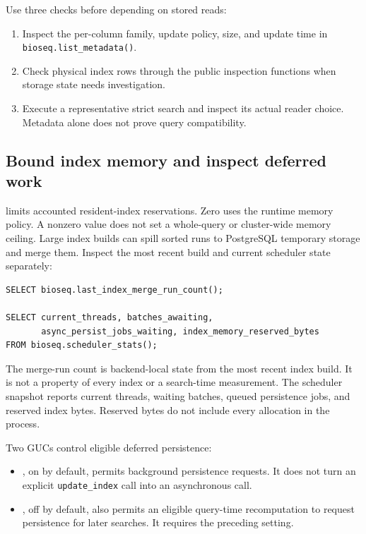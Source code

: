 Use three checks before depending on stored reads:
\begin{enumerate}
  \item Inspect the per-column family, update policy, size, and update
    time in \nolinkurl{bioseq.list_metadata()}.
  \item Check physical index rows through the public inspection
    functions when storage state needs investigation.
  \item Execute a representative strict search and inspect its actual
    reader choice. Metadata alone does not prove query compatibility.
\end{enumerate}

\subsection{Bound index memory and inspect deferred work}

 limits accounted resident-index
reservations. Zero uses the runtime memory policy. A nonzero value does
not set a whole-query or cluster-wide memory ceiling. Large index builds
can spill sorted runs to PostgreSQL temporary storage and merge them.
Inspect the most recent build and current scheduler state separately:

\par\noindent\begin{minipage}{\linewidth}
\begin{lstlisting}[style=bioseq-appendix-sql,
  caption={Inspect index construction and scheduler reservations.}]
SELECT bioseq.last_index_merge_run_count();

SELECT current_threads, batches_awaiting,
       async_persist_jobs_waiting, index_memory_reserved_bytes
FROM bioseq.scheduler_stats();
\end{lstlisting}
\end{minipage}

The merge-run count is backend-local state from the most recent index
build. It is not a property of every index or a search-time measurement.
The scheduler snapshot reports current threads, waiting batches, queued
persistence jobs, and reserved index bytes. Reserved bytes do not include
every allocation in the process.

Two GUCs control eligible deferred persistence:
\begin{itemize}
  \item {}, on by default,
    permits background persistence requests. It does not turn an explicit
    \texttt{update\_index} call into an asynchronous call.
  \item {}, off by
    default, also permits an eligible query-time recomputation to request
    persistence for later searches. It requires the preceding setting.
\end{itemize}

